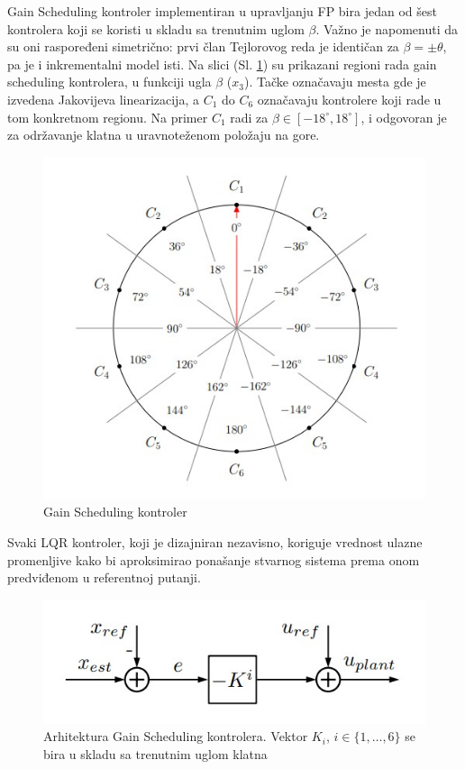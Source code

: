 \documentclass[a4paper,11pt]{article}
\theoremstyle{definition} \newtheorem{deff}{Definicija}[section]
\theoremstyle{definition} \newtheorem{prim}[deff]{Primer}
\theoremstyle{plain} \newtheorem{teor}[deff]{Teorema}
\begin{document}
	Gain Scheduling kontroler implementiran u upravljanju FP bira jedan od šest kontrolera koji se koristi u skladu sa trenutnim uglom $\beta$. Važno je napomenuti da su oni raspoređeni simetrično: prvi član Tejlorovog reda je identičan za $\beta = \pm \theta$, pa je i inkrementalni model isti. 
	Na slici (Sl. \ref{fig:ganSc}) su prikazani regioni rada gain scheduling kontrolera, u funkciji ugla $\beta$ ($x_3$). Tačke označavaju mesta gde je izvedena Jakovijeva linearizacija, a $C_1$ do $C_6$ označavaju kontrolere koji rade u tom konkretnom regionu. Na primer $C_1$ radi za $\beta \in [-18^\circ, 18^\circ]$, i odgovoran je za održavanje klatna u uravnoteženom položaju na gore.
	
	\begin{figure}[!h]
		\centering
		\includegraphics[width=0.6\linewidth]{slike/gainSc.jpg}
		\caption{Gain Scheduling kontroler \cite{inicijalna}}
		\label{fig:ganSc}
	\end{figure}
	
	Svaki LQR kontroler, koji je dizajniran nezavisno, koriguje vrednost ulazne promenljive kako bi aproksimirao ponašanje stvarnog sistema prema onom predviđenom u referentnoj putanji.
	
	\begin{figure}[!h]
		\centering
		\includegraphics[width=0.5\linewidth]{slike/applyLqr.jpg}
		\caption{Arhitektura Gain Scheduling kontrolera. Vektor $K_i$, $i \in \{1, \ldots, 6\}$ se bira u skladu sa trenutnim uglom klatna \cite{inicijalna}}
		\label{fig:archGain}
	\end{figure}
	
\end{document}
